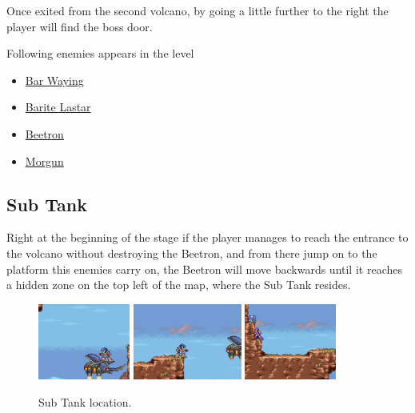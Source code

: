 Once exited from the second volcano, by going a little further to the right the player will find the boss door.

Following enemies appears in the level~\cite{wiki:Volcanic_zone}
\begin{itemize}
	\item \hyperlink{enem:Bar_Waying}{Bar Waying}
	\item \hyperlink{enem:Barite_Lastar}{Barite Lastar}
	\item \hyperlink{enem:Beetron}{Beetron}
	\item \hyperlink{enem:Morgun}{Morgun}
\end{itemize}


\subsection{Sub Tank}
Right at the beginning of the stage if the player manages to reach the entrance to the volcano without destroying the Beetron, and from there jump on to the platform this enemies carry on, the Beetron will move backwards until it reaches a hidden zone on the top left of the map, where the Sub Tank resides. 

\begin{figure}[htp]
	\centering
	\includegraphics[height=2.5cm]{figures/X2/Flame_stag/Stag_tank_2.jpg}
	\includegraphics[height=2.5cm]{figures/X2/Flame_stag/Stag_tank_3.jpg}
	\includegraphics[height=2.5cm]{figures/X2/Flame_stag/Stag_tank.png}	
	\caption{Sub Tank location.}
\end{figure}


